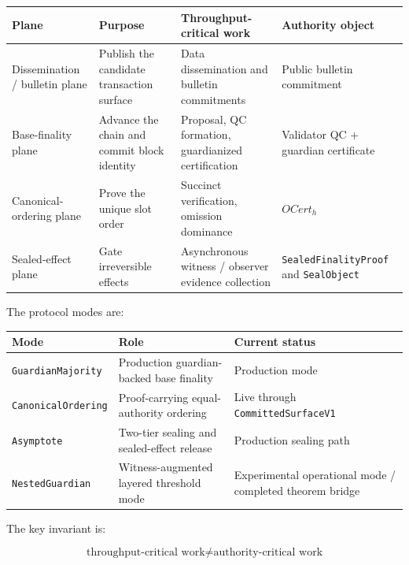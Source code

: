 \documentclass[11pt]{article}
\newcommand{\code}[1]{\texttt{#1}}
\begin{document}
\begin{center}
\small
\begin{tabularx}{\textwidth}{>{\raggedright\arraybackslash}p{} >{\raggedright\arraybackslash}p{} >{\raggedright\arraybackslash}p{} X}
\toprule
\textbf{Plane} & \textbf{Purpose} & \textbf{Throughput-critical work} & \textbf{Authority object} \\
\midrule
Dissemination / bulletin plane & Publish the candidate transaction surface & Data dissemination and bulletin commitments & Public bulletin commitment \\
Base-finality plane & Advance the chain and commit block identity & Proposal, QC formation, guardianized certification & Validator QC + guardian certificate \\
Canonical-ordering plane & Prove the unique slot order & Succinct verification, omission dominance & \(OCert_h\) \\
Sealed-effect plane & Gate irreversible effects & Asynchronous witness / observer evidence collection & \code{SealedFinalityProof} and \code{SealObject} \\
\bottomrule
\end{tabularx}
\end{center}

The protocol modes are:

\begin{center}
\small
\begin{tabularx}{\textwidth}{>{\raggedright\arraybackslash}p{} >{\raggedright\arraybackslash}p{} X}
\toprule
\textbf{Mode} & \textbf{Role} & \textbf{Current status} \\
\midrule
\code{GuardianMajority} & Production guardian-backed base finality & Production mode \\
\code{CanonicalOrdering} & Proof-carrying equal-authority ordering & Live through \code{CommittedSurfaceV1} \\
\code{Asymptote} & Two-tier sealing and sealed-effect release & Production sealing path \\
\code{NestedGuardian} & Witness-augmented layered threshold mode & Experimental operational mode / completed theorem bridge \\
\bottomrule
\end{tabularx}
\end{center}

The key invariant is:

\[
\text{throughput-critical work} \neq \text{authority-critical work}
\]
\end{document}
